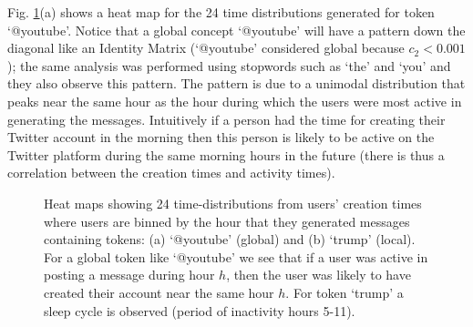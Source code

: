 Fig. \ref{fig_Explanation}(a) shows a heat map for the 24 time distributions generated for token `@youtube'. Notice that a global concept `@youtube' will have a pattern down the diagonal like an Identity Matrix (`@youtube' considered global because $c_2<0.001$); the same analysis was performed using stopwords such as `the' and `you' and they also observe this pattern. The pattern is due to a unimodal distribution that peaks near the same hour as the hour during which the users were most active in generating the messages. Intuitively if a person had the time for creating their Twitter account in the morning then this person is likely to be active on the Twitter platform during the same morning hours in the future (there is thus a correlation between the creation times and activity times).

\begin{figure}[htp]
   \caption[Peak Analysis over Message Traffic]{Heat maps showing 24 time-distributions from users’ creation times where users are binned by the hour that they generated messages containing tokens: (a) `@youtube' 
   (global) and (b) `trump' (local). For a global token like `@youtube' we see that if a user was active in posting a message during hour $h$, then the user was likely to have created their account near the same hour $h$. For token `trump' a sleep cycle is observed (period of inactivity hours 5-11).} \label{fig_Explanation}
\end{figure}

